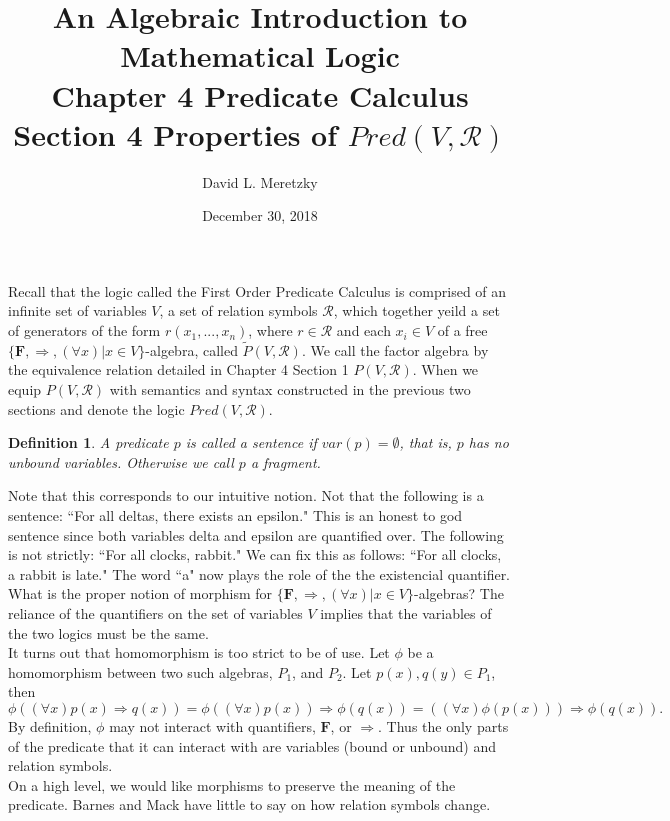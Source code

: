 \documentclass{article}
\title{ \vspace{-10ex} %
An Algebraic Introduction to Mathematical Logic\\
Chapter 4 Predicate Calculus \\
Section 4 Properties of $Pred(V, \mathscr{R})$ \\
}
\author{David L. Meretzky
}
\date{%
December 30, 2018
}
\theoremstyle{problemstyle}
\theoremstyle{lemmastyle}
\theoremstyle{theoremstyle}
\theoremstyle{problemstyle}
\newtheorem{definition}{Definition}
\theoremstyle{problemstyle}
\begin{document}
\maketitle

Recall that the logic called the First Order Predicate Calculus is comprised of an infinite set of variables $V$, a set of relation symbols $\mathscr{R}$, which together yeild a set of generators of the form $r(x_1,...,x_n)$, where $r \in \mathscr{R}$ and each $x_i \in V$ of a free $\{\textbf{F}, \Rightarrow, (\forall x) | x \in V\}$-algebra, called $\widetilde{P}(V,\mathscr{R})$. We call the factor algebra by the equivalence relation detailed in Chapter 4 Section 1 $P(V,\mathscr{R})$. When we equip $P(V,\mathscr{R})$ with semantics and syntax constructed in the previous two sections and denote the logic $Pred(V,\mathscr{R})$. 

\begin{definition}
A predicate $p$ is called a sentence if $var(p) = \emptyset$, that is, $p$ has no unbound variables. Otherwise we call $p$ a fragment. 
\end{definition}

Note that this corresponds to our intuitive notion. Not that the following is a sentence: ``For all deltas, there exists an epsilon." This is an honest to god sentence since both variables delta and epsilon are quantified over. The following is not strictly: ``For all clocks, rabbit." We can fix this as follows: ``For all clocks, a rabbit is late." The word ``a" now plays the role of the the existencial quantifier. \\

What is the proper notion of morphism for $\{\textbf{F}, \Rightarrow, (\forall x) | x \in V\}$-algebras? The reliance of the quantifiers on the set of variables $V$ implies that the variables of the two logics must be the same.\\

It turns out that homomorphism is too strict to be of use. Let $\phi$ be a homomorphism between two such algebras, $P_1$, and $P_2$. Let $p(x),q(y) \in P_1$, then $$\phi((\forall x)p(x) \Rightarrow q(x)) =\phi((\forall x)p(x)) \Rightarrow \phi(q(x)) =  ((\forall x)\phi(p(x))) \Rightarrow \phi(q(x)).$$ By definition, $\phi$ may not interact with quantifiers, $\textbf{F}$, or $\Rightarrow$. Thus the only parts of the predicate that it can interact with are variables (bound or unbound) and relation symbols.\\

On a high level, we would like morphisms to preserve the meaning of the predicate. Barnes and Mack have little to say on how relation symbols change.\\
\end{document}
